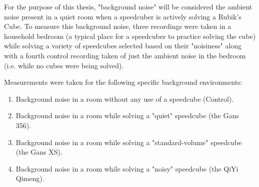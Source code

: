 For the purpose of this thesis, "background noise" will be considered the ambient noise present in a quiet room when a speedcuber is actively solving a Rubik's Cube.
To measure this background noise, three recordings were taken in a household bedroom (a typical place for a speedcuber to practice solving the cube) while solving a variety of speedcubes selected based on their "noisiness" along with a fourth control recording taken of just the ambient noise in the bedroom (i.e. while no cubes were being solved).

Measurements were taken for the following specific background environments:
\begin{enumerate}
    \item Background noise in a room without any use of a speedcube (Control).
    \item Background noise in a room while solving a "quiet" speedcube (the Gans 356).
    \item Background noise in a room while solving a "standard-volume" speedcube (the Gans XS).
    \item Background noise in a room while solving a "noisy" speedcube (the QiYi Qimeng).
\end{enumerate}

